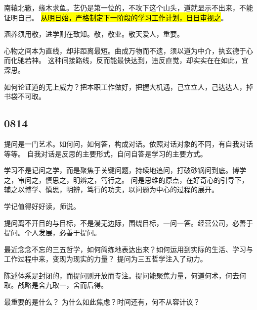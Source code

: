 南辕北辙，缘木求鱼。艺仍是第一位的，不攻下这个山头，道就显示不出来，不能证明自己。
\hl{从明日始，严格制定下一阶段的学习工作计划，日日审视之}。

涵养须用敬，进学则在致知。敬，敬业。敬天爱人，重要。

心物之间本为直线，却非距离最短。曲成万物而不遗，须以道为中介，执玄德于心而化驰若神。
这种间接路线，反而能最快达到，违反直觉，却实实在在如此，宜深思。

如何论证道的无上威力？把本职工作做好，把握大机遇，己立立人，己达达人，掉书袋不可取。

\subsection{0814}

提问是一门艺术。如何问，如何答，构成对话。依照对话对象的不同，有自我对话等等。
自我对话是反思的主要形式，自问自答是学习的主要方式。

学习不是记问之学，而是聚焦于关键问题，持续地追问，打破砂锅问到底。博学之，审问之，慎思之，明辨之，笃行之。
问是思维的原点，在好奇心的引导下，辅之以博学、慎思，明辨，笃行的功夫，以问题为中心的过程的展开。

学记值得好好读，师说。

提问离不开目的与目标，不是漫无边际，围绕目标，一问一答。经营公司，必善于提问。个人发展，必善于提问。

最近念念不忘的三五哲学，如何简练地表达出来？如何运用到实际的生活、学习与工作过程中来，变现为现实的力量？
提问为三五哲学注入了动力。

陈述体系是封闭的，而提问则开放而专注。提问能聚焦力量，何道何术，何去何取。战略是舍九取一，舍而后得。

最重要的是什么？ 为什么如此焦虑？时间还有，何不从容计议？
